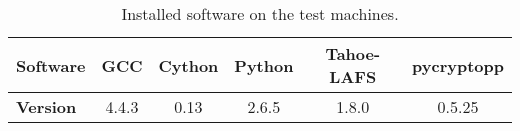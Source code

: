 \begin{table}[h]
  \centering
  \caption{Installed software on the test machines.}
  \begin{tabular}{ | l | c | c | c | c | c | }
    \hline
    \textbf{Software} & \ac{GCC} & Cython & Python & Tahoe-\ac{LAFS} & pycryptopp \\ \hline
    \textbf{Version} & 4.4.3 & 0.13 & 2.6.5 & 1.8.0 & 0.5.25 \\ \hline
  \end{tabular}
  \label{tbl:installedsw}
\end{table}
